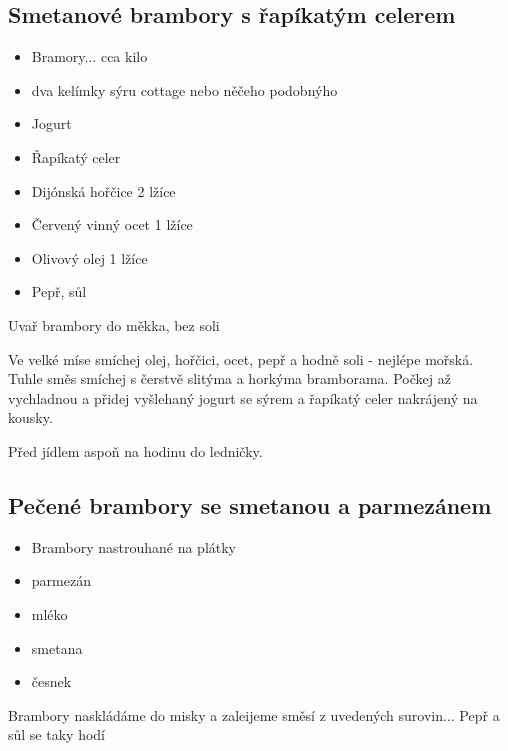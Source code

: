 \documentclass[10pt,a4paper]{article}
\newenvironment{myitemize}
{ \begin{itemize}
    \setlength{\itemsep}{0pt}
    \setlength{\parskip}{0pt}
    \setlength{\parsep}{0pt}     }
{ \end{itemize}                  }
\begin{document}
\subsection{Smetanové brambory s řapíkatým celerem}
\begin{minipage}[t]{0,5\textwidth}
\begin{myitemize} 
\item Bramory... cca kilo
\item dva kelímky sýru cottage nebo něčeho podobnýho
\item Jogurt
\item Řapíkatý celer
\item Dijónská hořčice 2 lžíce
\item Červený vinný ocet 1 lžíce
\item Olivový olej 1 lžíce
\item Pepř, sůl
\end{myitemize}
\end{minipage}
\begin{minipage}[t]{0,5\textwidth}
Uvař brambory do měkka, bez soli

Ve velké míse smíchej olej, hořčici, ocet, pepř a hodně soli - nejlépe mořská. Tuhle směs smíchej s čerstvě slitýma a horkýma bramborama. Počkej až vychladnou a přidej vyšlehaný jogurt se sýrem a řapíkatý celer nakrájený na kousky.

Před jídlem aspoň na hodinu do ledničky.
\end{minipage}
\subsection{Pečené brambory se smetanou a parmezánem}
\begin{minipage}[t]{0,5\textwidth}
\begin{myitemize} 
\item Brambory nastrouhané na plátky
\item parmezán
\item mléko
\item smetana
\item česnek
\end{myitemize}
\end{minipage}
\begin{minipage}[t]{0,5\textwidth}
Brambory naskládáme do misky a zaleijeme směsí z uvedených surovin... Pepř a sůl se taky hodí 
\end{minipage}
\end{document}
